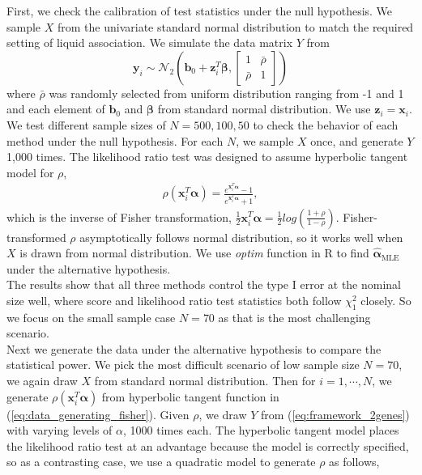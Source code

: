 \documentclass[aap,authoryear, preprint]{imsart}
\numberwithin{equation}{section}
\theoremstyle{plain}
\begin{document}
First, we check the calibration of test statistics under the null hypothesis. We sample $X$ from the univariate standard normal distribution to match the required setting of liquid association. We simulate the data matrix $Y$ from 
$$\bm{y}_i \sim \mathcal{N}_2\left(\bm{b}_0 + \bm{z}_i^T\bm{\beta}, \begin{bmatrix} 1 & \bar{\rho} \\ \bar{\rho} & 1 \end{bmatrix}  \right)$$ 
where $\bar{\rho}$ was randomly selected from uniform distribution ranging from -1 and 1 and each element of $\bm{b}_0$ and $\bm{\beta}$ from standard normal distribution. We use $\bm{z}_i = \bm{x}_i$. We test different sample sizes of $N = 500, 100, 50$ to check the behavior of each method under the null hypothesis. For each $N$, we sample $X$ once, and generate $Y$ 1,000 times. The likelihood ratio test was designed to assume hyperbolic tangent model for $\rho$,
\begin{align}
    \rho(\bm{x}_i^T\bm{\alpha}) = \frac{e^{\bm{x}_i^T\bm{\alpha}}-1}{e^{\bm{x}_i^T\bm{\alpha}}+1},
    \label{eq:data_generating_fisher}
\end{align}
which is the inverse of Fisher transformation, 
$\frac{1}{2} \bm{x}_i^T\bm{\alpha} = \frac{1}{2}log \left(\frac{1+\rho}{1-\rho}\right)$. Fisher-transformed $\rho$ asymptotically follows normal distribution, so it works well when $X$ is drawn from normal distribution. We use \textit{optim} function in R to find $\hat{\bm{\alpha}}_{\text{MLE}}$ under the alternative hypothesis. \\

The results show that all three methods control the type I error at the nominal size well, where score and likelihood ratio test statistics both follow $\chi_1^2$ closely. So we focus on the small sample case $N=70$ as that is the most challenging scenario.\\

Next we generate the data under the alternative hypothesis to compare the statistical power. We pick the most difficult scenario of low sample size $N=70$, we again draw $X$ from standard normal distribution. Then for $i = 1, \cdots, N$, we generate $\rho(\bm{x}_i^T\bm{\alpha})$ from hyperbolic tangent function in (\ref{eq:data_generating_fisher}). Given $\rho$, we draw $Y$ from (\ref{eq:framework_2genes}) with varying levels of $\alpha$, 1000 times each. The hyperbolic tangent model places the likelihood ratio test at an advantage because the model is correctly specified, so as a contrasting case, we use a quadratic model to generate $\rho$ as follows,
\end{document}
